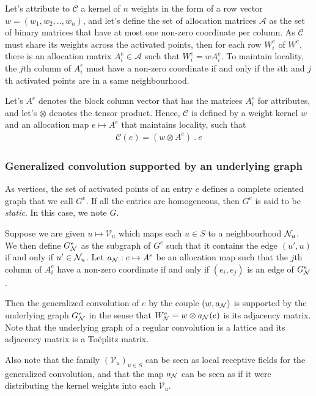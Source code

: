Let's attribute to $\mathcal{C}$ a kernel of $n$ weights in the form of a row vector $w = (w_1,w_2,..,w_n)$, and let's define the set of allocation matrices $\mathcal{A}$ as the set of binary matrices that have at most one non-zero coordinate per column. As $\mathcal{C}$ must share its weights across the activated points, then for each row $W^e_i$ of $W^e$, there is an allocation matrix $A^e_i \in \mathcal{A}$ such that $W^e_i = wA^e_i$. To maintain locality, the $j$th column of $A^e_i$ must have a non-zero coordinate if and only if the $i$th and $j$th activated points are in a same neighbourhood.

Let's $A^e$ denotes the block column vector that has the matrices $A^e_i$ for attributes, and let's $\otimes$ denotes the tensor product. Hence, $\mathcal{C}$ is defined by a weight kernel $w$ and an allocation map $e \mapsto A^e$ that maintains locality, such that
\begin{align}
\mathcal{C}(e) = (w \otimes A^e)\ .\ e
\end{align}

  \subsubsection{Generalized convolution supported by an underlying graph}

As vertices, the set of activated points of an entry $e$ defines a complete oriented graph that we call $G^e$. If all the entries are homogeneous, then $G^e$ is said to be \textit{static}. In this case, we note $G$.

Suppose we are given $u \mapsto \mathcal{V}_u$ which maps each $u \in S$ to a neighbourhood $\mathcal{N}_u$. We then define  $G^e_{\mathcal{N}}$ as the subgraph of $G^e$ such that it contains the edge $(u',u)$ if and only if $u' \in \mathcal{N}_{u}$. Let $a_{\mathcal{N}}: e \mapsto A^e$ be an allocation map such that the $j$th column of $A^e_i$ have a non-zero coordinate if and only if $(e_i,e_j)$ is an edge of $G^e_{\mathcal{N}}$.

Then the generalized convolution of $e$ by the couple $(w,a_{\mathcal{N}})$ is supported by the underlying graph $G^e_{\mathcal{N}}$ in the sense that $W^e_{\mathcal{N}} = w \otimes a_{\mathcal{N}}(e)$ is its adjacency matrix. Note that the underlying graph of a regular convolution is a lattice and its adjacency matrix is a Toëplitz matrix.

Also note that the family $(\mathcal{V}_u)_{u \in S}$ can be seen as local receptive fields for the generalized convolution, and that the map $a_{\mathcal{N}}$ can be seen as if it were distributing the kernel weights into each $\mathcal{V}_u$.\\

